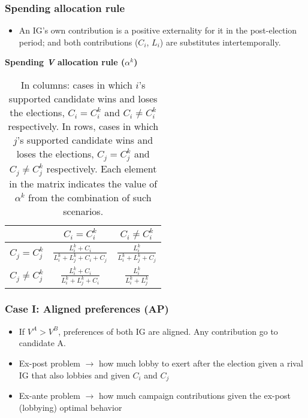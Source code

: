 \documentclass[handout,final,xcolor=dvipsnames]{beamer}
\begin{document}
  \begin{frame}\frametitle{Spending allocation rule}
    \begin{itemize}
    \item An IG's own contribution is a positive externality for it
      in the post-election period; and both contributions ($C_i$,
      $L_i$) are substitutes intertemporally. 
      \end{itemize}
    \begin{table}[ht]
\begin{center}
\textbf{Spending \textsl{V} allocation rule ($\alpha^k$)} \\
\vspace{3 mm}
\begin{tabular}[t]{l |c |c}
     &   $C_i = C^k_i$   &    $C_i \neq C^k_i$   \\
\hline
$C_j = C^k_j$ &   $\frac{L^k_i + C_i}{L^k_i + L^k_j + C_i + C_j}$  & $\frac{L^k_i }{L^k_i + L^k_j + C_j}$ \\
\hline
$C_j \neq C^k_j$ &   $\frac{L^k_i + C_i}{L^k_i + L^k_j + C_i}$  & $\frac{L^k_i }{L^k_i + L^k_j}$ \\
\end{tabular}
\caption{\scriptsize In columns: cases in which $i$'s supported candidate wins and loses the elections, $C_i = C^k_i$ and $C_i \neq C^k_i$ respectively. In rows, cases in which $j$'s supported candidate wins and loses the elections, $C_j = C^k_j$ and $C_j \neq C^k_j$ respectively. Each element in the matrix indicates the value of $\alpha^k$ from the combination of such scenarios.}
\end{center}
\end{table}
  \end{frame}


    \begin{frame}\frametitle{Case I: Aligned preferences (AP)}
  \begin{itemize}\itemsep 10pt
  \item If $V^A>V^B$, preferences of both IG are aligned. Any
    contribution go to candidate A.
  \item Ex-post problem $\longrightarrow$ how much lobby to exert
    after the election given a rival IG that also lobbies and given
    $C_i$ and $C_j$
    \item Ex-ante problem $\longrightarrow$ how much campaign
      contributions given the ex-post (lobbying) optimal behavior 
    \end{itemize}
  \end{frame}
\end{document}
